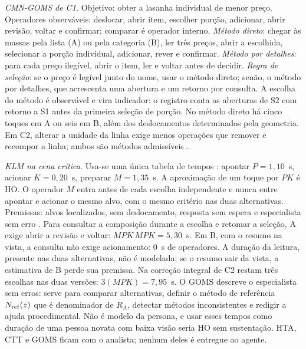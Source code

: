 \textit{CMN-GOMS de C1.} Objetivo: obter a lasanha individual de menor preço. Operadores observáveis: deslocar, abrir item, escolher porção, adicionar, abrir revisão, voltar e confirmar; comparar é operador interno. \emph{Método direto}: chegar às massas pela lista (A) ou pela categoria (B), ler três preços, abrir a escolhida, selecionar a porção individual, adicionar, rever e confirmar. \emph{Método por detalhes}: para cada preço ilegível, abrir o item, ler e voltar antes de decidir. \emph{Regra de seleção}: se o preço é legível junto do nome, usar o método direto; senão, o método por detalhes, que acrescenta uma abertura e um retorno por consulta. A escolha do método é observável e vira indicador: o registro conta as aberturas de S2 com retorno a S1 antes da primeira seleção de porção. No método direto há cinco toques em A ou seis em B, além dos deslocamentos determinados pela geometria. Em C2, alterar a unidade da linha exige menos operações que remover e recompor a linha; ambos são métodos admissíveis \cite[cap.~5, pp.~139--192]{card83}.
\par\textit{KLM na cena crítica.} Usa-se uma única tabela de tempos \cite[p.~399, Tabela~I]{card80}: apontar $P=1{,}10$~s, acionar $K=0{,}20$~s, preparar $M=1{,}35$~s. A aproximação de um toque por $PK$ é HO. O operador $M$ entra antes de cada escolha independente e nunca entre apontar e acionar o mesmo alvo, com o mesmo critério nas duas alternativas. Premissas: alvos localizados, sem deslocamento, resposta sem espera e especialista sem erro \cite[pp.~448--456]{preece}. Para consultar a composição durante a escolha e retomar a seleção, A exige abrir a revisão e voltar: $MPK\,MPK=5{,}30$~s. Em B, com o resumo na vista, a consulta não exige acionamento: $0$~s de operadores. A duração da leitura, presente nas duas alternativas, não é modelada; se o resumo sair da vista, a estimativa de B perde sua premissa. Na correção integral de C2 restam três escolhas nas duas versões: $3(MPK)=7{,}95$~s. O GOMS descreve o especialista sem erros: serve para comparar alternativas, definir o método de referência $N_{\rm ref}(z)$ que é denominador de $R_A$, detectar métodos inconsistentes e redigir a ajuda procedimental. Não é modelo da persona, e usar esses tempos como duração de uma pessoa novata com baixa visão seria HO sem sustentação. HTA, CTT e GOMS ficam com o analista; nenhum deles é entregue ao agente.
